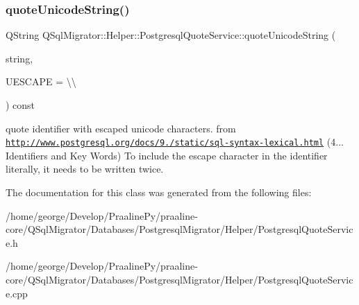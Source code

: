 \subsubsection{\texorpdfstring{quote\+Unicode\+String()}{quoteUnicodeString()}}
{\footnotesize\ttfamily Q\+String Q\+Sql\+Migrator\+::\+Helper\+::\+Postgresql\+Quote\+Service\+::quote\+Unicode\+String (\begin{DoxyParamCaption}\item[{const Q\+String \&}]{string,  }\item[{const char}]{U\+E\+S\+C\+A\+PE = {\ttfamily \textquotesingle{}\textbackslash{}\textbackslash{}\textquotesingle{}} }\end{DoxyParamCaption}) const}

quote identifier with escaped unicode characters. from \href{http://www.postgresql.org/docs/9.3/static/sql-syntax-lexical.html}{\tt http\+://www.\+postgresql.\+org/docs/9./static/sql-\/syntax-\/lexical.\+html} (4... Identifiers and Key Words) To include the escape character in the identifier literally, it needs to be written twice. 

The documentation for this class was generated from the following files\+:\begin{DoxyCompactItemize}
\item 
/home/george/\+Develop/\+Praaline\+Py/praaline-\/core/\+Q\+Sql\+Migrator/\+Databases/\+Postgresql\+Migrator/\+Helper/Postgresql\+Quote\+Service.\+h\item 
/home/george/\+Develop/\+Praaline\+Py/praaline-\/core/\+Q\+Sql\+Migrator/\+Databases/\+Postgresql\+Migrator/\+Helper/Postgresql\+Quote\+Service.\+cpp\end{DoxyCompactItemize}
